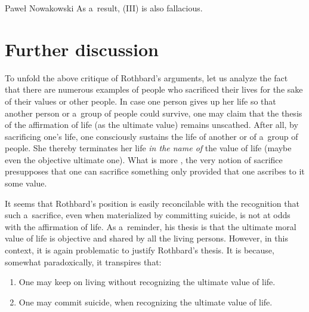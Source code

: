 \begin{artengenv}{Paweł Nowakowski}
As a~result, (III) is also fallacious.



\section{Further discussion}

To unfold the above critique of Rothbard's arguments, let us analyze the fact that there are numerous examples of people who sacrificed their lives for the sake of their values or other people. In case one person gives up her life so that another person or a~group of people could survive, one may claim that the thesis of the affirmation of life (as the ultimate value) remains unscathed. After all, by sacrificing one's life, one consciously sustains the life of another or of a~group of people. She thereby terminates her life \textit{in the name of} the value of life (maybe even the objective ultimate one). What is more 
\parencites[see][p.1]{Raz2017On}[][p.76]{Weiss1949Sacrifice}, %
 the very notion of sacrifice presupposes that one can sacrifice something only provided that one ascribes to it some value.



It seems that Rothbard's position is easily reconcilable with the recognition that such a~sacrifice, even when materialized by committing suicide, is not at odds with the affirmation of life. As a~reminder, his thesis is that the ultimate moral value of life is objective and shared by all the living persons. However, in this context, it is again problematic to justify Rothbard's thesis. It is because, somewhat paradoxically, it transpires that:



\begin{enumerate}[label=(\arabic*)]

\item  One may keep on living without recognizing the ultimate value of life.



\item One may commit suicide, when recognizing the ultimate value of life.

\end{enumerate}


\end{artengenv}
